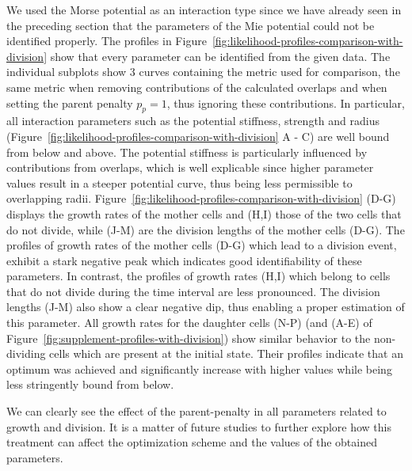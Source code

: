 We used the Morse potential as an interaction type since we have already seen in the preceding
section that the parameters of the Mie potential could not be identified properly.
The profiles in Figure~\ref{fig:likelihood-profiles-comparison-with-division} show that every
parameter can be identified from the given data.
The individual subplots show 3 curves containing the metric used for comparison, the same metric
when removing contributions of the calculated overlaps and when setting the parent penalty $p_p=1$,
thus ignoring these contributions.
In particular, all interaction parameters such as the potential stiffness, strength and radius
(Figure~\ref{fig:likelihood-profiles-comparison-with-division} A - C) are well bound from below and
above.
The potential stiffness is particularly influenced by contributions from overlaps, which is well
explicable since higher parameter values result in a steeper potential curve, thus being less
permissible to overlapping radii.
Figure~\ref{fig:likelihood-profiles-comparison-with-division} (D-G) displays the growth rates of
the mother cells and (H,I) those of the two cells that do not divide, while (J-M) are the division
lengths of the mother cells (D-G).
The profiles of growth rates of the mother cells (D-G) which lead to a division event, exhibit a
stark negative peak which indicates good identifiability of these parameters.
In contrast, the profiles of growth rates (H,I) which belong to cells that do not divide during the
time interval are less pronounced.
The division lengths (J-M) also show a clear negative dip, thus enabling a proper estimation of
this parameter.
All growth rates for the daughter cells (N-P) (and (A-E) of
Figure~\ref{fig:supplement-profiles-with-division}) show similar behavior to the
non-dividing cells which are present at the initial state.
Their profiles indicate that an optimum was achieved and significantly increase with higher values
while being less stringently bound from below.

We can clearly see the effect of the parent-penalty in all parameters related to growth and
division.
It is a matter of future studies to further explore how this treatment can affect the optimization
scheme and the values of the obtained parameters.

